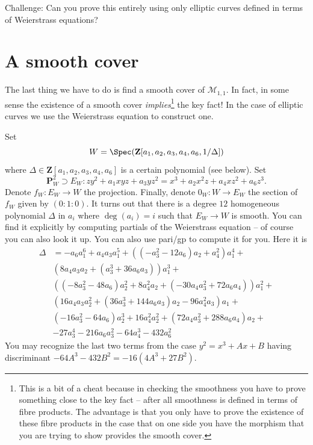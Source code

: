 \medskip\noindent
Challenge: Can you prove this entirely using only elliptic curves
defined in terms of Weierstrass equations?

\section{A smooth cover}
\label{stacks-introduction-section-smooth}
The last thing we have to do is find a smooth cover of $\mathcal{M}_{1, 1}$.
In fact, in some sense the existence of a smooth cover
{\it implies}\footnote{This is a bit of a cheat because
in checking the smoothness you have to prove something close to
the key fact -- after all smoothness is defined in terms of
fibre products. The advantage is that you only have to prove the existence
of these fibre products in the case that on one side you have the morphism
that you are trying to show provides the smooth cover.} the key fact!
In the case of elliptic curves we use the Weierstrass equation to
construct one.

\medskip\noindent
Set
$$
W = \Spec(\mathbf{Z}[a_1, a_2, a_3, a_4, a_6, 1/\Delta])
$$
where $\Delta \in \mathbf{Z}[a_1, a_2, a_3, a_4, a_6]$ is a certain
polynomial (see below). Set
$$
\mathbf{P}_W^2 \supset E_W :
zy^2 + a_1 xyz + a_3 yz^2 = x^3 + a_2x^2z + a_4xz^2 + a_6z^3.
$$
Denote $f_W : E_W \to W$ the projection. Finally, denote $0_W : W \to E_W$
the section of $f_W$ given by $(0 : 1 : 0)$. It turns out that
there is a degree $12$ homogeneous polynomial $\Delta$ in $a_i$
where $\deg(a_i) = i$ such that $E_W \to W$ is smooth.
You can find it explicitly by computing partials of the
Weierstrass equation -- of course you can also look it up. You can
also use pari/gp to compute it for you. Here it is
\begin{align*}
\Delta & = -a_6a_1^6 + a_4a_3a_1^5 + ((-a_3^2 - 12a_6)a_2 + a_4^2)a_1^4 + \\
& (8a_4a_3a_2 + (a_3^3 + 36a_6a_3))a_1^3 + \\
& ((-8a_3^2 - 48a_6)a_2^2 + 8a_4^2a_2 + (-30a_4a_3^2 + 72a_6a_4))a_1^2 + \\
& (16a_4a_3a_2^2 + (36a_3^3 + 144a_6a_3)a_2 - 96a_4^2a_3)a_1 + \\
& (-16a_3^2 - 64a_6)a_2^3 + 16a_4^2a_2^2 + (72a_4a_3^2 + 288a_6a_4)a_2 + \\
& -27a_3^4 - 216a_6a_3^2  -64a_4^3 - 432a_6^2
\end{align*}
You may recognize the last two terms from the case
$y^2 = x^3 + Ax + B$ having discriminant $-64A^3 - 432B^2 = -16(4A^3 + 27B^2)$.

